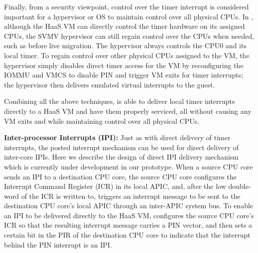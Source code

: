 Finally, from a security viewpoint, control over the timer interrupt is considered important for a hypervisor or OS to maintain control over all physical CPUs.
In \na, although the HaaS VM can directly control the timer hardware on its assigned CPUs, the SVMV hypervisor can still regain 
control over the CPUs when needed, such as before live migration. 
The hypervisor always controls the CPU0 and its local timer. 
To regain control over other physical CPUs assigned to the VM, the hypervisor 
simply disables direct timer access for the VM by reconfiguring the IOMMU and VMCS to 
disable PIN and trigger VM exits for timer interrupts; the hypervisor then delivers
emulated virtual interrupts to the guest.

Combining all the above techniques, \na is able to deliver local timer interrupts 
directly to a HaaS VM and have them properly serviced, 
all without causing any VM exits and while maintaining control over all physical CPUs.


{\bf Inter-processor Interrupts (IPI):} 
Just as with direct delivery of timer interrupts, the posted interrupt mechanism can be used for direct delivery of inter-core IPIs.
Here we describe the design of direct IPI delivery mechanism which is currently under development in our prototype.
When a source CPU core sends an IPI to a destination CPU core, the source CPU core configures the Interrupt Command Register (ICR) in its local APIC, 
and, after the low double-word of the ICR is written to, triggers an interrupt message to be sent to the destination CPU core's local APIC through an inter-APIC system bus.
To enable an IPI to be delivered directly to the HaaS VM, \na configures the source CPU core's ICR so that the resulting interrupt message carries a PIN vector,
and then sets a certain bit in the PIR of the destination CPU core to indicate that the interrupt behind the PIN interrupt is an IPI.

 



